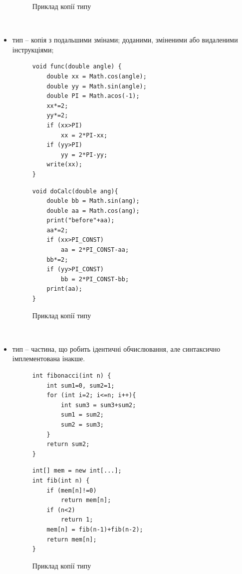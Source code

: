 \documentclass[a4paper, 14pt]{article}
\newcommand{\RNum}[1]{\uppercase\expandafter{\romannumeral #1\relax}}
\begin{document}
\begin{itemize}
\begin{figure}[!htb]
\begin{minipage}[t]{.45\textwidth}
\end{minipage}
\caption{Приклад копії \RNum{2} типу}
\end{figure} \\
\item \RNum{3} тип -- копія з подальшими змінами; доданими, зміненими або видаленими інструкціями;
\begin{figure} 
\centering
\begin{minipage}[t]{.45\textwidth}
\begin{lstlisting}[frame=none]
void func(double angle) {
	double xx = Math.cos(angle);
	double yy = Math.sin(angle);
	double PI = Math.acos(-1);
	xx*=2;
	yy*=2;	
	if (xx>PI)
		xx = 2*PI-xx;
	if (yy>PI)
		yy = 2*PI-yy;
	write(xx);
}
\end{lstlisting}
\end{minipage}
\begin{minipage}[t]{.45\textwidth}
\begin{lstlisting}[frame=none]
void doCalc(double ang){
	double bb = Math.sin(ang);
	double aa = Math.cos(ang);
	print("before"+aa);
	aa*=2;
	if (xx>PI_CONST)
		aa = 2*PI_CONST-aa;
	bb*=2;	
	if (yy>PI_CONST)
		bb = 2*PI_CONST-bb;
	print(aa);
}
\end{lstlisting}
\end{minipage}
\caption{Приклад копії \RNum{3} типу}
\end{figure} \\
\item \RNum{4} тип -- частина, що робить ідентичні обчислювання, але синтаксично імплементована інакше.
\begin{figure}
\centering
\begin{minipage}[t]{.45\textwidth}
\begin{lstlisting}[frame=none]
int fibonacci(int n) {
	int sum1=0, sum2=1;
	for (int i=2; i<=n; i++){
		int sum3 = sum3+sum2;
		sum1 = sum2;
		sum2 = sum3;
	}
	return sum2;
}
\end{lstlisting}
\end{minipage}
\begin{minipage}[t]{.45\textwidth}
\begin{lstlisting}[frame=none]
int[] mem = new int[...];
int fib(int n) {
	if (mem[n]!=0)
		return mem[n];
	if (n<2)
		return 1;
	mem[n] = fib(n-1)+fib(n-2);
	return mem[n];
}
\end{lstlisting}
\end{minipage}
\caption{Приклад копії \RNum{4} типу}
\end{figure} \\
\end{itemize}
\end{document}
